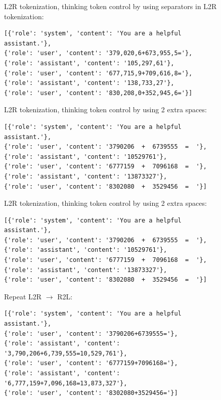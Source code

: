 \documentclass{article}
\theoremstyle{plain}
\theoremstyle{definition}
\theoremstyle{remark}
\begin{document}
\begin{figure}[H]
L2R tokenization, thinking token control by using separators in L2R tokenization:
    \begin{verbatim}
[{'role': 'system', 'content': 'You are a helpful assistant.'}, 
{'role': 'user', 'content': '379,020,6+673,955,5='}, 
{'role': 'assistant', 'content': '105,297,61'}, 
{'role': 'user', 'content': '677,715,9+709,616,8='}, 
{'role': 'assistant', 'content': '138,733,27'}, 
{'role': 'user', 'content': '830,208,0+352,945,6='}]
\end{verbatim}
\end{figure}

\begin{figure}[H]
L2R tokenization, thinking token control by using 2 extra spaces:
    \begin{verbatim}
[{'role': 'system', 'content': 'You are a helpful assistant.'}, 
{'role': 'user', 'content': '3790206  +  6739555  =  '}, 
{'role': 'assistant', 'content': '10529761'}, 
{'role': 'user', 'content': '6777159  +  7096168  =  '}, 
{'role': 'assistant', 'content': '13873327'}, 
{'role': 'user', 'content': '8302080  +  3529456  =  '}]
\end{verbatim}
\end{figure}

\begin{figure}[H]
L2R tokenization, thinking token control by using 2 extra spaces:
    \begin{verbatim}
[{'role': 'system', 'content': 'You are a helpful assistant.'}, 
{'role': 'user', 'content': '3790206  +  6739555  =  '}, 
{'role': 'assistant', 'content': '10529761'}, 
{'role': 'user', 'content': '6777159  +  7096168  =  '}, 
{'role': 'assistant', 'content': '13873327'}, 
{'role': 'user', 'content': '8302080  +  3529456  =  '}]
\end{verbatim}
\end{figure}

\begin{figure}[H]
Repeat L2R $\rightarrow$ R2L:
    \begin{verbatim}
[{'role': 'system', 'content': 'You are a helpful assistant.'}, 
{'role': 'user', 'content': '3790206+6739555='}, 
{'role': 'assistant', 'content': '3,790,206+6,739,555=10,529,761'}, 
{'role': 'user', 'content': '6777159+7096168='}, 
{'role': 'assistant', 'content': '6,777,159+7,096,168=13,873,327'}, 
{'role': 'user', 'content': '8302080+3529456='}]
\end{verbatim}
\end{figure}
\end{document}
